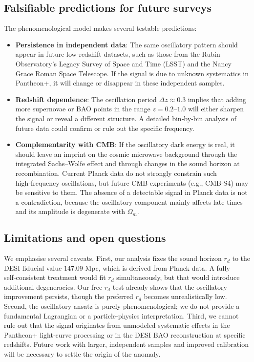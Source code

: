 \documentclass[10pt,a4paper,twocolumn]{article}
\begin{document}
\subsection{Falsifiable predictions for future surveys}
The phenomenological model makes several testable predictions:
\begin{itemize}
    \item \textbf{Persistence in independent data}: The same oscillatory pattern should appear in future low‑redshift datasets, such as those from the Rubin Observatory’s Legacy Survey of Space and Time (LSST) and the Nancy Grace Roman Space Telescope. If the signal is due to unknown systematics in Pantheon+, it will change or disappear in these independent samples.
    \item \textbf{Redshift dependence}: The oscillation period $\Delta z \approx 0.3$ implies that adding more supernovae or BAO points in the range $z=0.2$–$1.0$ will either sharpen the signal or reveal a different structure. A detailed bin‑by‑bin analysis of future data could confirm or rule out the specific frequency.
    \item \textbf{Complementarity with CMB}: If the oscillatory dark energy is real, it should leave an imprint on the cosmic microwave background through the integrated Sachs–Wolfe effect and through changes in the sound horizon at recombination. Current Planck data do not strongly constrain such high‑frequency oscillations, but future CMB experiments (e.g., CMB‑S4) may be sensitive to them. The absence of a detectable signal in Planck data is not a contradiction, because the oscillatory component mainly affects late times and its amplitude is degenerate with $\Omega_m$.
\end{itemize}

\subsection{Limitations and open questions}
We emphasise several caveats. First, our analysis fixes the sound horizon $r_d$ to the DESI fiducial value $147.09$ Mpc, which is derived from Planck data. A fully self‑consistent treatment would fit $r_d$ simultaneously, but that would introduce additional degeneracies. Our free‑$r_d$ test already shows that the oscillatory improvement persists, though the preferred $r_d$ becomes unrealistically low. Second, the oscillatory ansatz is purely phenomenological; we do not provide a fundamental Lagrangian or a particle‑physics interpretation. Third, we cannot rule out that the signal originates from unmodeled systematic effects in the Pantheon+ light‑curve processing or in the DESI BAO reconstruction at specific redshifts. Future work with larger, independent samples and improved calibration will be necessary to settle the origin of the anomaly.
\end{document}
